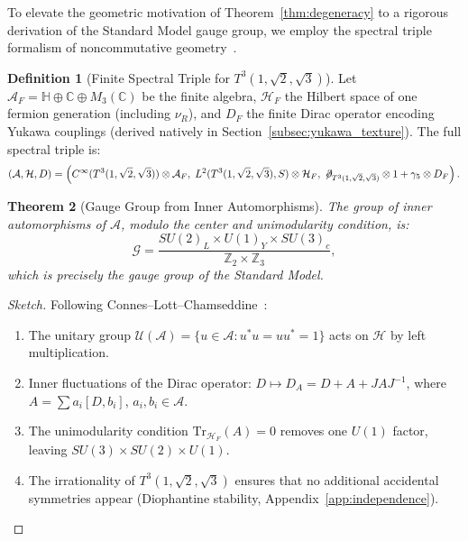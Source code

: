 \documentclass[onecolumn,aps,prd,superscriptaddress,nofootinbib,amsmath,amssymb]{revtex4-2}
\newtheorem{theorem}{Theorem}[section]
\theoremstyle{definition}
\newtheorem{definition}[theorem]{Definition}
\theoremstyle{remark}
\newcommand{\Tthree}{T^3(1,\sqrt{2},\sqrt{3})}
\newcommand{\slashed}[1]{\ensuremath{\not\!#1}}
\begin{document}
To elevate the geometric motivation of Theorem~\ref{thm:degeneracy} to a rigorous derivation of the Standard Model gauge group, we employ the spectral triple formalism of noncommutative geometry~\cite{connes1994,chamseddine2007}.

\begin{definition}[Finite Spectral Triple for $\Tthree$]
\label{def:finite_triple}
Let $\mathcal{A}_F = \mathbb{H} \oplus \mathbb{C} \oplus M_3(\mathbb{C})$ be the finite algebra, $\mathcal{H}_F$ the Hilbert space of one fermion generation (including $\nu_R$), and $D_F$ the finite Dirac operator encoding Yukawa couplings (derived natively in Section~\ref{subsec:yukawa_texture}). The full spectral triple is:
\begin{equation}
(\mathcal{A}, \mathcal{H}, D) = \left( C^\infty(\Tthree) \otimes \mathcal{A}_F, \; 
L^2(\Tthree,S) \otimes \mathcal{H}_F, \; 
\slashed{\partial}_{\Tthree} \otimes 1 + \gamma_5 \otimes D_F \right).
\end{equation}
\end{definition}

\begin{theorem}[Gauge Group from Inner Automorphisms]
\label{thm:gauge_group}
The group of inner automorphisms of $\mathcal{A}$, modulo the center and unimodularity condition, is:
\begin{equation}
\mathcal{G} = \frac{SU(2)_L \times U(1)_Y \times SU(3)_c}{\mathbb{Z}_2 \times \mathbb{Z}_3},
\end{equation}
which is precisely the gauge group of the Standard Model.
\end{theorem}

\begin{proof}[Sketch]
Following Connes--Lott--Chamseddine~\cite{connes1994,chamseddine2007}:
\begin{enumerate}[noitemsep]
\item The unitary group $\mathcal{U}(\mathcal{A}) = \{u \in \mathcal{A} : u^*u = uu^* = 1\}$ acts on $\mathcal{H}$ by left multiplication.
\item Inner fluctuations of the Dirac operator: $D \mapsto D_A = D + A + J A J^{-1}$, where $A = \sum a_i [D, b_i]$, $a_i,b_i \in \mathcal{A}$.
\item The unimodularity condition $\text{Tr}_{\mathcal{H}_F}(A) = 0$ removes one $U(1)$ factor, leaving $SU(3)\times SU(2)\times U(1)$.
\item The irrationality of $\Tthree$ ensures that no additional accidental symmetries appear (Diophantine stability, Appendix~\ref{app:independence}).
\end{enumerate}
\end{proof}
\end{document}
